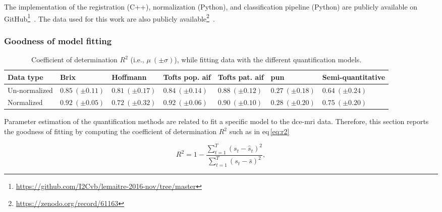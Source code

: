 The implementation of the registration (C++), normalization (Python), and classification pipeline (Python) are publicly available on GitHub\footnote{\url{https://github.com/I2Cvb/lemaitre-2016-nov/tree/master}}~\cite{lemaitre2016github}.
The data used for this work are also publicly available\footnote{\url{https://zenodo.org/record/61163}}~\cite{lemaitre2016dce}.



\subsubsection{Goodness of model fitting}\label{subsubsec:chp5:DCE-norm:Good}


\begin{table}
  \caption{Coefficient of determination $R^{2}$ (i.e., $\mu \ (\pm \sigma)$), while fitting data with the different quantification models.}
  \centering
  \scriptsize
  \begin{tabularx}{\textwidth}{lXXXXXX}
    \toprule
    \textbf{Data type} & \textbf{Brix} & \textbf{Hoffmann} & \textbf{Tofts pop. \acs*{aif}} & \textbf{Tofts pat. \acs*{aif}} & \textbf{\acs*{pun}} & \textbf{Semi-quantitative} \\
    \midrule
    Un-normalized & $0.85 \ (\pm 0.11)$ & $0.81 \ (\pm 0.17)$ & $0.84 \ (\pm 0.14)$ & $0.88 \ (\pm 0.12)$ & $0.27 \ (\pm 0.18)$ & $0.64 \ (\pm 0.24)$  \\
    Normalized    & $0.92 \ (\pm 0.05)$ & $0.72 \ (\pm 0.32)$ & $0.92 \ (\pm 0.06)$ & $0.90 \ (\pm 0.10)$ & $0.28 \ (\pm 0.20)$ & $0.75 \ (\pm 0.20)$  \\
    \bottomrule
  \end{tabularx}
  \label{tab:r2}
\end{table}

Parameter estimation of the quantification methods are related to fit a specific model to the \ac{dce}-\ac{mri} data.
Therefore, this section reports the goodness of fitting by computing the coefficient of determination $R^2$ such as in \acs{eq}\,\eqref{eq:r2}

\begin{equation}
  R^2 = 1 - \frac{\sum_{t = 1}^{T} (s_t - \hat{s}_t)^2}{\sum_{t = 1}^{T} (s_t - \bar{s})^2} ,
  \label{eq:r2}
\end{equation}

